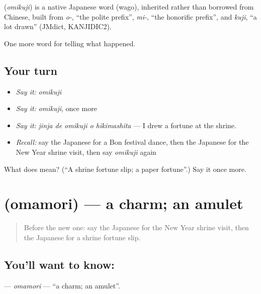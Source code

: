 \begin{cousinweb}
\textbf{} (\emph{omikuji}) is a native Japanese word (wago), inherited rather than borrowed from Chinese, built from \emph{o-}, \textquotedblleft{}the polite prefix\textquotedblright{}, \emph{mi-}, \textquotedblleft{}the honorific prefix\textquotedblright{}, and \emph{kuji}, \textquotedblleft{}a lot drawn\textquotedblright{} (JMdict, KANJIDIC2).
\end{cousinweb}

\begin{grammarlens}[title={What you've built}]
One more word for telling what happened.
\end{grammarlens}

\subsection*{Your turn}
\begin{itemize}
\raggedright
  \item \emph{Say it:} \emph{omikuji}
  \item \emph{Say it:} \emph{omikuji}, once more
  \item \emph{Say it:} \emph{jinja de omikuji o hikimashita} — I drew a fortune at the shrine.
  \item \emph{Recall:} say the Japanese for a Bon festival dance, then the Japanese for the New Year shrine visit, then say \emph{omikuji} again
\end{itemize}

\begin{tcolorbox}[breakable,colback=teal!4,colframe=teal!35!black,title={Before you move on}]
What does  mean? (\textquotedblleft{}A shrine fortune slip; a paper fortune\textquotedblright{}.) Say it once more.
\end{tcolorbox}
\section[\texorpdfstring{\ja{おまもり} (omamori)}{おまもり (omamori)}]{ (omamori) — a charm; an amulet}

\label{lesson:JA-C295-omamori}



\begin{quote}
Before the new one: say the Japanese for the New Year shrine visit, then the Japanese for a shrine fortune slip.
\end{quote}

\subsection*{You'll want to know: }
\textbf{} — \emph{omamori} — \textquotedblleft{}a charm; an amulet\textquotedblright{}.

